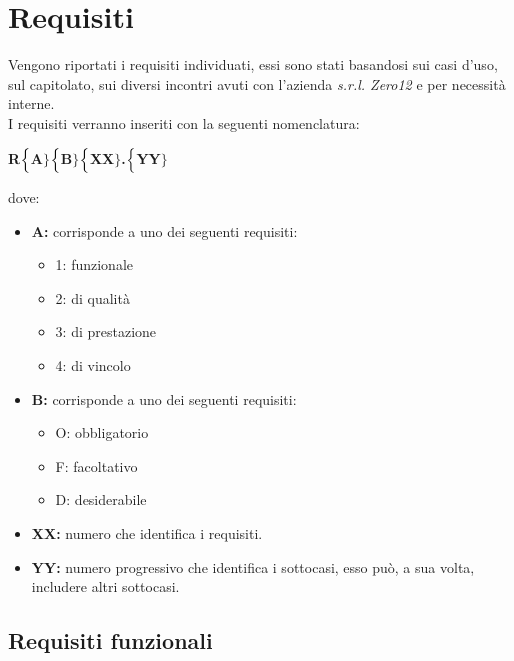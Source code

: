 \chapter{Requisiti}
Vengono riportati i requisiti individuati, essi sono stati basandosi sui casi d'uso, sul capitolato, sui diversi incontri avuti con l'azienda \textit{s.r.l. Zero12} e per necessità interne. \\
I requisiti verranno inseriti con la seguenti nomenclatura:
\begin{center}
	\textbf{R$\Bigl\{$A$\Bigr\}$$\Bigl\{$B$\Bigr\}$$\Bigl\{$XX$\Bigr\}$.$\Bigl\{$YY$\Bigr\}$}
\end{center}
dove:
\begin{itemize}
	\item \textbf{A:} corrisponde a uno dei seguenti requisiti:
	\begin{itemize}
		\item 1: funzionale
		\item 2: di qualità
		\item 3: di prestazione
		\item 4: di vincolo
	\end{itemize}
	\item \textbf{B:} corrisponde a uno dei seguenti requisiti:
	\begin{itemize}
		\item O: obbligatorio
		\item F: facoltativo
		\item D: desiderabile
	\end{itemize}
	\item \textbf{{XX}:} numero che identifica i requisiti.
	\item \textbf{{YY}:} numero progressivo che identifica i sottocasi, esso può, a sua volta, includere altri sottocasi.
\end{itemize}

\section{Requisiti funzionali}

